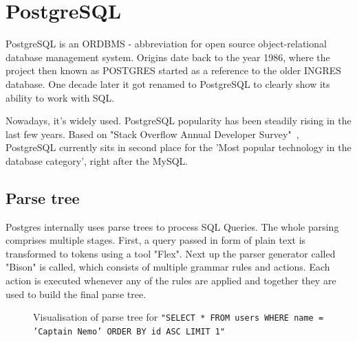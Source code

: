 \section{PostgreSQL}
PostgreSQL is an ORDBMS - abbreviation for open source object-relational database management system. Origins date back to the year 1986, where the project then known as POSTGRES started as a reference to the older INGRES database. One decade later it got renamed to PostgreSQL to clearly show its ability to work with SQL.\cite{PostgreSQL} 

Nowadays, it's widely used. PostgreSQL popularity has been steadily rising in the last few years. Based on "Stack Overflow Annual Developer Survey"~\cite{Stackoverflow survey}, PostgreSQL currently sits in second place for the 'Most popular technology in the database category', right after the MySQL.

\subsection{Parse tree}
Postgres internally uses parse trees to process SQL Queries. The whole parsing comprises multiple stages. First, a query passed in form of plain text is transformed to tokens using a tool "Flex". Next up the parser generator called "Bison" is called, which consists of multiple grammar rules and actions. Each action is executed whenever any of the rules are applied and together they are used to build the final parse tree.
\newline

\begin{figure}[h]
  \caption {Visualisation of parse tree for \texttt{"SELECT * FROM users WHERE name = 'Captain Nemo' ORDER BY id ASC LIMIT 1"}}
\end{figure}
